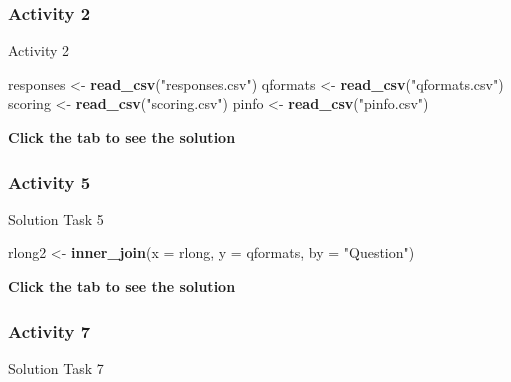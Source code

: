 \documentclass[]{book}
\newenvironment{Shaded}{\begin{snugshade}}{\end{snugshade}}
\newcommand{\CommentTok}[1]{\textcolor[rgb]{0.56,0.35,0.01}{\textit{#1}}}
\newcommand{\DataTypeTok}[1]{\textcolor[rgb]{0.13,0.29,0.53}{#1}}
\newcommand{\KeywordTok}[1]{\textcolor[rgb]{0.13,0.29,0.53}{\textbf{#1}}}
\newcommand{\NormalTok}[1]{#1}
\newcommand{\OperatorTok}[1]{\textcolor[rgb]{0.81,0.36,0.00}{\textbf{#1}}}
\newcommand{\StringTok}[1]{\textcolor[rgb]{0.31,0.60,0.02}{#1}}
\begin{document}
\hypertarget{activity-2}{%
\subsubsection{Activity 2}\label{activity-2}}

Activity 2

\begin{Shaded}
\begin{Highlighting}[]
\NormalTok{responses <-}\StringTok{ }\KeywordTok{read_csv}\NormalTok{(}\StringTok{"responses.csv"}\NormalTok{)                  }
\NormalTok{qformats <-}\StringTok{ }\KeywordTok{read_csv}\NormalTok{(}\StringTok{"qformats.csv"}\NormalTok{)                 }
\NormalTok{scoring <-}\StringTok{ }\KeywordTok{read_csv}\NormalTok{(}\StringTok{"scoring.csv"}\NormalTok{)                  }
\NormalTok{pinfo <-}\StringTok{ }\KeywordTok{read_csv}\NormalTok{(}\StringTok{"pinfo.csv"}\NormalTok{)}
\end{Highlighting}
\end{Shaded}

\textbf{Click the tab to see the solution}

\hypertarget{activity-5-1}{%
\subsubsection{Activity 5}\label{activity-5-1}}

Solution Task 5

\begin{Shaded}
\begin{Highlighting}[]
\NormalTok{rlong2 <-}\StringTok{ }\KeywordTok{inner_join}\NormalTok{(}\DataTypeTok{x =}\NormalTok{ rlong, }\DataTypeTok{y =}\NormalTok{ qformats, }\DataTypeTok{by =} \StringTok{"Question"}\NormalTok{)}
\end{Highlighting}
\end{Shaded}

\textbf{Click the tab to see the solution}

\hypertarget{activity-7-1}{%
\subsubsection{Activity 7}\label{activity-7-1}}

Solution Task 7

\begin{Shaded}
\end{Shaded}
\end{document}
